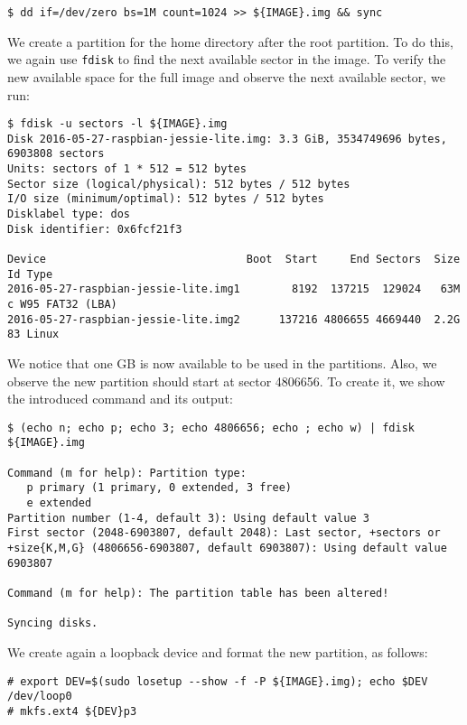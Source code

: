 \begin{lstlisting}[]
$ dd if=/dev/zero bs=1M count=1024 >> ${IMAGE}.img && sync
\end{lstlisting}
\FloatBarrier
\vspace{-5mm}

We create a partition for the home directory after the root partition.
To do this, we again use \texttt{fdisk} to find the next available sector
in the image. To verify the new available space for the full image and observe
the next available sector, we run:
\begin{lstlisting}[]
$ fdisk -u sectors -l ${IMAGE}.img
Disk 2016-05-27-raspbian-jessie-lite.img: 3.3 GiB, 3534749696 bytes, 6903808 sectors
Units: sectors of 1 * 512 = 512 bytes
Sector size (logical/physical): 512 bytes / 512 bytes
I/O size (minimum/optimal): 512 bytes / 512 bytes
Disklabel type: dos
Disk identifier: 0x6fcf21f3

Device                               Boot  Start     End Sectors  Size Id Type
2016-05-27-raspbian-jessie-lite.img1        8192  137215  129024   63M  c W95 FAT32 (LBA)
2016-05-27-raspbian-jessie-lite.img2      137216 4806655 4669440  2.2G 83 Linux
\end{lstlisting}
\FloatBarrier
\vspace{-5mm}

We notice that one GB is now available to be used in the partitions. Also, we
observe the new partition should start at sector 4806656. To create it, we
show the introduced command and its output:

\begin{lstlisting}[]
$ (echo n; echo p; echo 3; echo 4806656; echo ; echo w) | fdisk ${IMAGE}.img

Command (m for help): Partition type:
   p primary (1 primary, 0 extended, 3 free)
   e extended
Partition number (1-4, default 3): Using default value 3
First sector (2048-6903807, default 2048): Last sector, +sectors or
+size{K,M,G} (4806656-6903807, default 6903807): Using default value 6903807

Command (m for help): The partition table has been altered!

Syncing disks.
\end{lstlisting}
\FloatBarrier
\vspace{-5mm}

We create again a loopback device and format the new partition, as follows:
\begin{lstlisting}[]
# export DEV=$(sudo losetup --show -f -P ${IMAGE}.img); echo $DEV
/dev/loop0
# mkfs.ext4 ${DEV}p3
\end{lstlisting}
\FloatBarrier
\vspace{-5mm}

